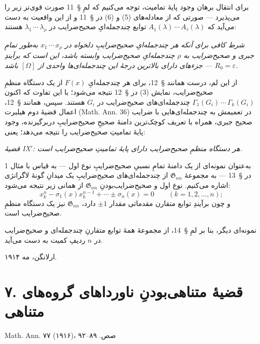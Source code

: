 \documentclass[11pt]{article}
\providecommand{\Gdom}{\mathfrak{G}}
\providecommand{\rcdots}{\,\cdots\,}
\providecommand{\eps}{\varepsilon}
\begin{document}
برای انتقال برهان وجود پایهٔ تمامیت، توجه می‌کنیم که لمِ \S\ 11 صورت قوی‌تر زیر را می‌پذیرد --- صورتی که از معادله‌های (5) و (6) در \S\ 11 و از این واقعیت به دست می‌آید که $A_1(\lambda)\rcdots A_\tau(\lambda)$ توابع چندجمله‌ایِ صحیح‌ضرایب در $\lambda_1\rcdots\lambda_\rho$ هستند:

\emph{شرط کافی برای آنکه هر چندجمله‌ایِ صحیح‌ضرایبِ دلخواه در $x_1\rcdots x_\rho$ به‌طور تمامِ جبری و صحیح‌ضرایب به $\rho$ چندجمله‌ایِ صحیح‌ضرایب وابسته باشد، این است که برآیندِ جزءهای دارای بالاترین درجهٔ این چندجمله‌ای‌ها واحدی از $[\Omega]$ باشد --- $R_0=\eps$.}

از این لم، درست همانند \S\ 12، برای هر چندجمله‌ایِ $F(x)$ از یک دستگاه منظمِ صحیح‌ضرایب، نمایش (3) در \S\ 12 نتیجه می‌شود؛ با این تفاوت که اکنون $\Gamma_1(G_i)\rcdots\Gamma_k(G_i)$ چندجمله‌ای‌های صحیح‌ضرایب در $G_i$ هستند. سپس، همانند \S\ 12، اعمال قضیهٔ دوم هیلبرت (Math. Ann. 36) در تعمیمش به چندجمله‌ای‌هایی با ضرایب صحیح جبری، همراه با تعریف کوچک‌ترین دامنهٔ صحیحِ صحیح‌ضرایبِ دربرگیرنده، وجود پایهٔ تمامیتِ صحیح‌ضرایب را نتیجه می‌دهد؛ یعنی:

\emph{قضیهٔ IX$'$: هر دستگاه منظمِ صحیح‌ضرایب دارای پایهٔ تمامیتِ صحیح‌ضرایب است.}

به‌عنوان نمونه‌ای از یک دامنهٔ تمامِ نسبیِ صحیح‌ضرایبِ نوع اول --- به قیاس با مثال 1 در \S\ 13 --- به مجموعهٔ $\Gdom_{nn}$ از چندجمله‌ای‌های صحیح‌ضرایبِ یک میدانِ گونهٔ لاگرانژی اشاره می‌کنیم. نوع اول و صحیح‌ضرایب‌بودنِ $\Gdom_{nn}$ از همانی زیر نتیجه می‌شود:
\[
  x_k^n-\sigma_1(x)x_k^{n-1}+\cdots\pm\sigma_n(x)=0
  \qquad(k=1,2,
\ldots,n);
\]
و چون برآیندِ توابع متقارن مقدماتی مقدار $\pm1$ دارد، $\Gdom_{nn}$ نیز یک دستگاه منظمِ صحیح‌ضرایب است.

نمونه‌ای دیگر، بنا بر لمِ \S\ 14، از مجموعهٔ همهٔ توابع متقارنِ چندجمله‌ای و صحیح‌ضرایب در $n$ ردیفِ کمیت به دست می‌آید.

ارلانگن، مه ۱۹۱۴.

\clearpage

\providecommand{\Hgrp}{\mathfrak{H}}
\providecommand{\GaloisRes}{\Phi}
\providecommand{\pol}[2]{\left(#1\frac{\partial}{\partial #2}\right)}
\providecommand{\Deltaop}{\Delta\!\left(\frac{\partial}{\partial x},\frac{\partial}{\partial y},\frac{\partial}{\partial z}\right)}
\providecommand{\Omegaop}{\Omega}
\providecommand{\NoetherSrcNote}[2]{\textsuperscript{#1}\begingroup\renewcommand{\thefootnote}{}\footnotetext{\textsuperscript{#1}~#2}\endgroup}


\clearpage
\setcounter{footnote}{0}
\section*{۷. قضیهٔ متناهی‌بودنِ ناورداهای گروه‌های متناهی}
\begin{center}
Math. Ann. ۷۷ (۱۹۱۶)، صص. ۸۹--۹۲
\end{center}
\end{document}
